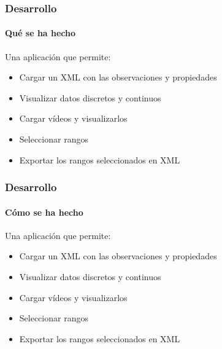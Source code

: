 \begin{frame}
	\frametitle{Desarrollo}
	\framesubtitle{Qu\'e se ha hecho}
	Una aplicaci\'on que permite:
	\begin{itemize}
		\item Cargar un XML con las observaciones y propiedades
		\item Visualizar datos discretos y continuos
		\item Cargar v\'ideos y visualizarlos
		\item Seleccionar rangos
		\item Exportar los rangos seleccionados en XML
	\end{itemize}
	
\end{frame}

\begin{frame}
	\frametitle{Desarrollo}
	\framesubtitle{C\'omo se ha hecho}
	Una aplicaci\'on que permite:
	\begin{itemize}
		\item Cargar un XML con las observaciones y propiedades
		\item Visualizar datos discretos y continuos
		\item Cargar v\'ideos y visualizarlos
		\item Seleccionar rangos
		\item Exportar los rangos seleccionados en XML
	\end{itemize}
	
\end{frame}